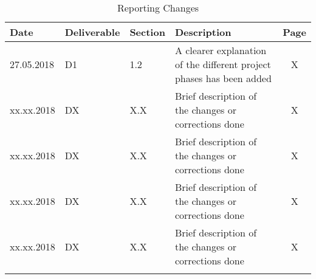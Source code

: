 \begin{longtable}[H]{l l l p{7cm} c}
	
	\toprule[2pt]
	
	\textbf{Date} & \textbf{Deliverable} & \textbf{Section} &  \textbf{Description} & \textbf{Page} \\
	
	\midrule[1.5pt] 
	\endhead
	
	27.05.2018 & D1 & 1.2  & A clearer explanation of the different project phases has been added & X \vspace{0.2cm} \\
	
	\midrule

	xx.xx.2018 & DX & X.X  & Brief description of the changes or corrections done & X \vspace{0.2cm} \\
	
	\midrule

	xx.xx.2018 & DX & X.X  & Brief description of the changes or corrections done & X \vspace{0.2cm} \\
	
	\midrule

	xx.xx.2018 & DX & X.X  & Brief description of the changes or corrections done & X \vspace{0.2cm} \\
	
	\midrule
		
	xx.xx.2018 & DX & X.X  & Brief description of the changes or corrections done & X \vspace{0.2cm} \\
	
	\bottomrule[2pt]
	
	\caption{Reporting Changes}
\end{longtable}

